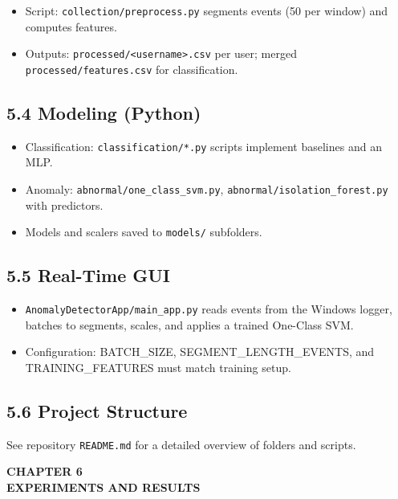 \documentclass[
  11pt,
  a4paper,
]{article}
\providecommand{\tightlist}{%
  \setlength{\itemsep}{0pt}\setlength{\parskip}{0pt}}
\begin{document}
\begin{itemize}
\tightlist
\item
  Script: \texttt{collection/preprocess.py} segments events (50 per
  window) and computes features.
\item
  Outputs: \texttt{processed/\textless{}username\textgreater{}.csv} per
  user; merged \texttt{processed/features.csv} for classification.
\end{itemize}

\subsection{5.4 Modeling (Python)}\label{modeling-python}

\begin{itemize}
\tightlist
\item
  Classification: \texttt{classification/*.py} scripts implement
  baselines and an MLP.
\item
  Anomaly: \texttt{abnormal/one\_class\_svm.py},
  \texttt{abnormal/isolation\_forest.py} with predictors.
\item
  Models and scalers saved to \texttt{models/} subfolders.
\end{itemize}

\subsection{5.5 Real-Time GUI}\label{real-time-gui}

\begin{itemize}
\tightlist
\item
  \texttt{AnomalyDetectorApp/main\_app.py} reads events from the Windows
  logger, batches to segments, scales, and applies a trained One-Class
  SVM.
\item
  Configuration: BATCH\_SIZE, SEGMENT\_LENGTH\_EVENTS, and
  TRAINING\_FEATURES must match training setup.
\end{itemize}

\subsection{5.6 Project Structure}\label{project-structure}

See repository \texttt{README.md} for a detailed overview of folders and
scripts.

\newpage
\thispagestyle{plain}

\begin{center}
\vspace*{2cm}
\textbf{\Large CHAPTER 6}\\[0.5cm]
\textbf{\Large EXPERIMENTS AND RESULTS}
\end{center}
\end{document}
